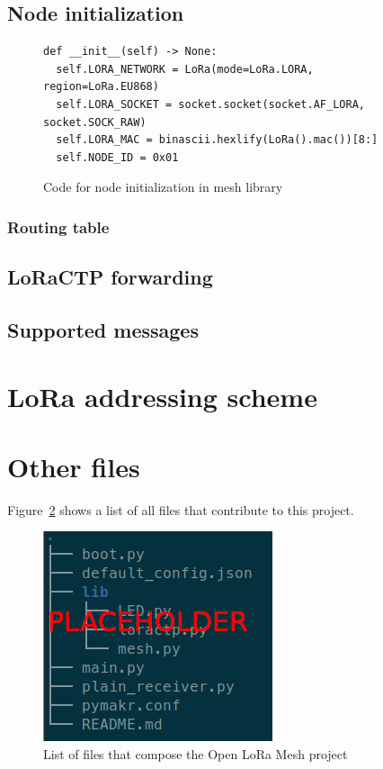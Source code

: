 			\subsection{Node initialization}
				\begin{figure}
					\begin{lstlisting}
def __init__(self) -> None:
  self.LORA_NETWORK = LoRa(mode=LoRa.LORA, region=LoRa.EU868)
  self.LORA_SOCKET = socket.socket(socket.AF_LORA, socket.SOCK_RAW)
  self.LORA_MAC = binascii.hexlify(LoRa().mac())[8:]
  self.NODE_ID = 0x01
					\end{lstlisting}
					\label{code:node_initialization}
					\caption{Code for node initialization in mesh library}
				\end{figure}
		
			\subsubsection{Routing table}\label{subsec:routing_table}
		
		\subsection{LoRaCTP forwarding}\label{subsec:loractp_mesh}
		
		
		\subsection{Supported messages}
		
	\section{LoRa addressing scheme}\label{subsec:lora_addressing}
		
		
		
		
	\section{Other files}
	
		Figure~\ref{img:files} shows a list of all files that contribute to this project.
		
		\begin{figure}[h]
			\centering
			\includegraphics[width=.5\textwidth]{resources/img/chap5/tree_files}
			\caption{List of files that compose the Open LoRa Mesh project}
			\label{img:files}
		\end{figure}
	
